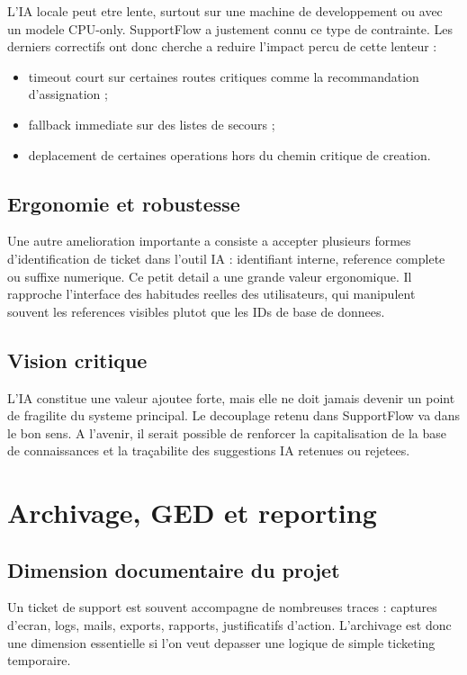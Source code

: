 \documentclass[12pt,a4paper,oneside]{report}
\begin{document}
L'IA locale peut etre lente, surtout sur une machine de developpement ou avec un modele CPU-only. SupportFlow a justement connu ce type de contrainte. Les derniers correctifs ont donc cherche a reduire l'impact percu de cette lenteur :

\begin{itemize}[leftmargin=1.2cm]
  \item timeout court sur certaines routes critiques comme la recommandation d'assignation ;
  \item fallback immediate sur des listes de secours ;
  \item deplacement de certaines operations hors du chemin critique de creation.
\end{itemize}

\section{Ergonomie et robustesse}

Une autre amelioration importante a consiste a accepter plusieurs formes d'identification de ticket dans l'outil IA : identifiant interne, reference complete ou suffixe numerique. Ce petit detail a une grande valeur ergonomique. Il rapproche l'interface des habitudes reelles des utilisateurs, qui manipulent souvent les references visibles plutot que les IDs de base de donnees.

\section{Vision critique}

L'IA constitue une valeur ajoutee forte, mais elle ne doit jamais devenir un point de fragilite du systeme principal. Le decouplage retenu dans SupportFlow va dans le bon sens. A l'avenir, il serait possible de renforcer la capitalisation de la base de connaissances et la traçabilite des suggestions IA retenues ou rejetees.

\chapter{Archivage, GED et reporting}

\section{Dimension documentaire du projet}

Un ticket de support est souvent accompagne de nombreuses traces : captures d'ecran, logs, mails, exports, rapports, justificatifs d'action. L'archivage est donc une dimension essentielle si l'on veut depasser une logique de simple ticketing temporaire.
\end{document}
